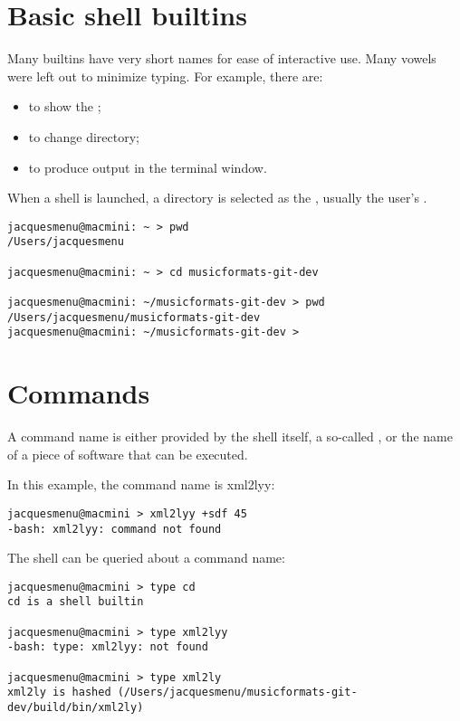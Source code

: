 \section{Basic shell builtins}

Many builtins have very short names for ease of interactive use. Many vowels were left out to minimize typing. For example, there are:
\begin{itemize}
\item {} to show the \currentWorkingDirectory;
\item {} to change directory;
\item {} to produce output in the terminal window.
\end{itemize}

When a shell is launched, a directory is selected as the \currentWorkingDirectory, usually the user's .
\begin{lstlisting}[language=Terminal]
jacquesmenu@macmini: ~ > pwd
/Users/jacquesmenu

jacquesmenu@macmini: ~ > cd musicformats-git-dev

jacquesmenu@macmini: ~/musicformats-git-dev > pwd
/Users/jacquesmenu/musicformats-git-dev
jacquesmenu@macmini: ~/musicformats-git-dev >
\end{lstlisting}


\section{Commands}

A command name is either provided by the shell itself, a so-called , or the name of a piece of software that can be executed.

In this example, the command name is xml2lyy:
\begin{lstlisting}[language=Terminal]
jacquesmenu@macmini > xml2lyy +sdf 45
-bash: xml2lyy: command not found
\end{lstlisting}

The shell can be queried about a command name:
\begin{lstlisting}[language=Terminal]
jacquesmenu@macmini > type cd
cd is a shell builtin

jacquesmenu@macmini > type xml2lyy
-bash: type: xml2lyy: not found

jacquesmenu@macmini > type xml2ly
xml2ly is hashed (/Users/jacquesmenu/musicformats-git-dev/build/bin/xml2ly)
\end{lstlisting}


